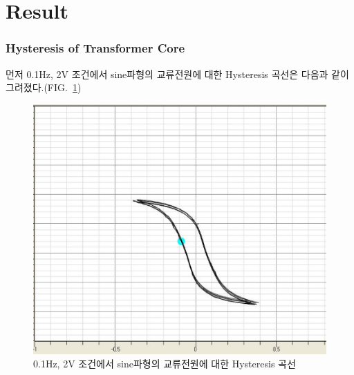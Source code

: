 \documentclass[aps,reprint,superscriptaddress,10pt]{revtex4-2}
\begin{document}
\newpage

\section{Result}

\subsubsection{Hysteresis of Transformer Core}

먼저 0.1Hz, 2V 조건에서 sine파형의 교류전원에 대한 Hysteresis 곡선은 다음과 같이
그려졌다.(FIG.~\ref{fig:sine,0.1,2})

\begin{figure}[htbp]
  \centering
  \includegraphics[scale = 0.15]{sine,0.1,2.png}
  \caption{0.1Hz, 2V 조건에서 sine파형의 교류전원에 대한 Hysteresis 곡선}
  \label{fig:sine,0.1,2}
\end{figure}
\end{document}

